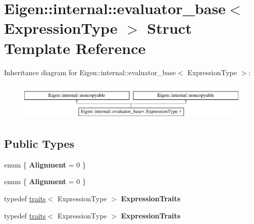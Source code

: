 \hypertarget{struct_eigen_1_1internal_1_1evaluator__base}{}\section{Eigen\+:\+:internal\+:\+:evaluator\+\_\+base$<$ Expression\+Type $>$ Struct Template Reference}
\label{struct_eigen_1_1internal_1_1evaluator__base}
Inheritance diagram for Eigen\+:\+:internal\+:\+:evaluator\+\_\+base$<$ Expression\+Type $>$\+:\begin{figure}[H]
\begin{center}
\leavevmode
\includegraphics[height=1.824104cm]{struct_eigen_1_1internal_1_1evaluator__base}
\end{center}
\end{figure}
\subsection*{Public Types}
\begin{DoxyCompactItemize}
\item 
\mbox{\label{struct_eigen_1_1internal_1_1evaluator__base_a6e8eeb3702629f456863755b3ff038c2}} 
enum \{ {\bfseries Alignment} = 0
 \}
\item 
\mbox{\label{struct_eigen_1_1internal_1_1evaluator__base_a299ebf2b6db3ebabda0ef1977b4c713e}} 
enum \{ {\bfseries Alignment} = 0
 \}
\item 
\mbox{\label{struct_eigen_1_1internal_1_1evaluator__base_acb94884a759bb59a96c8c3eea1e50c10}} 
typedef \hyperlink{struct_eigen_1_1internal_1_1traits}{traits}$<$ Expression\+Type $>$ {\bfseries Expression\+Traits}
\item 
\mbox{\label{struct_eigen_1_1internal_1_1evaluator__base_acb94884a759bb59a96c8c3eea1e50c10}} 
typedef \hyperlink{struct_eigen_1_1internal_1_1traits}{traits}$<$ Expression\+Type $>$ {\bfseries Expression\+Traits}
\end{DoxyCompactItemize}


